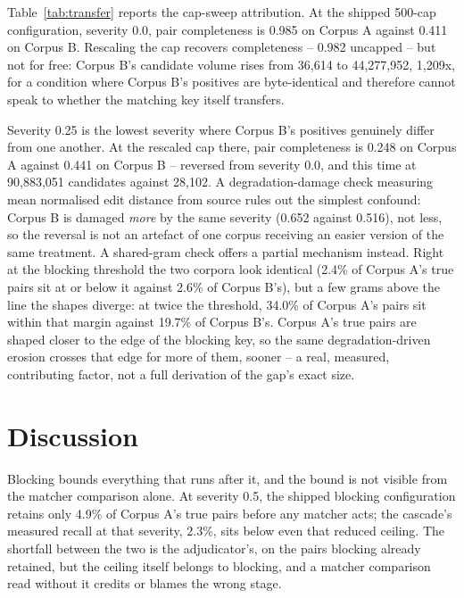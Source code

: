 \documentclass[conference]{IEEEtran}
\begin{document}
Table~\ref{tab:transfer} reports the cap-sweep attribution. At the
shipped 500-cap configuration, severity 0.0, pair completeness is 0.985
on Corpus A against 0.411 on Corpus B. Rescaling the cap recovers
completeness -- 0.982 uncapped -- but not for free: Corpus B's
candidate volume rises from 36,614 to 44,277,952, 1,209x, for a
condition where Corpus B's positives are byte-identical and therefore
cannot speak to whether the matching key itself transfers.



Severity 0.25 is the lowest severity where Corpus B's positives
genuinely differ from one another. At the rescaled cap there, pair
completeness is 0.248 on Corpus A against 0.441 on Corpus B --
reversed from severity 0.0, and this time at 90,883,051 candidates
against 28,102. A degradation-damage check measuring mean normalised
edit distance from source rules out the simplest confound: Corpus B is
damaged \emph{more} by the same severity (0.652 against 0.516), not
less, so the reversal is not an artefact of one corpus receiving an
easier version of the same treatment. A shared-gram check offers a
partial mechanism instead. Right at the blocking threshold the two
corpora look identical (2.4\% of Corpus A's true pairs sit at or below
it against 2.6\% of Corpus B's), but a few grams above the line the
shapes diverge: at twice the threshold, 34.0\% of Corpus A's pairs sit
within that margin against 19.7\% of Corpus B's. Corpus A's true pairs
are shaped closer to the edge of the blocking key, so the same
degradation-driven erosion crosses that edge for more of them, sooner
-- a real, measured, contributing factor, not a full derivation of the
gap's exact size.

\section{Discussion}
\label{sec:discussion}

Blocking bounds everything that runs after it, and the bound is not
visible from the matcher comparison alone. At severity 0.5, the
shipped blocking configuration retains only 4.9\% of Corpus A's true
pairs before any matcher acts; the cascade's measured recall at that
severity, 2.3\%, sits below even that reduced ceiling. The shortfall
between the two is the adjudicator's, on the pairs blocking already
retained, but the ceiling itself belongs to blocking, and a matcher
comparison read without it credits or blames the wrong stage.
\end{document}
